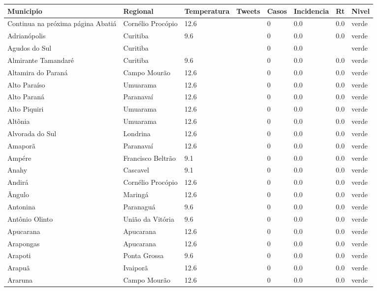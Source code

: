\begin{longtable}{l|lllllll}
  \hline
Municipio & Regional & Temperatura & Tweets & Casos & Incidencia & Rt & Nivel \\ 
  \hline
\endhead
\hline
{\footnotesize Continua na próxima página}
\endfoot
\endlastfoot
Abatiá & Cornélio Procópio & 12.6 &  & 0 & 0.0 & 0.0 & verde \\ 
  Adrianópolis & Curitiba & 9.6 &  & 0 & 0.0 & 0.0 & verde \\ 
  Agudos do Sul & Curitiba &  &  & 0 & 0.0 &  & verde \\ 
  Almirante Tamandaré & Curitiba & 9.6 &  & 0 & 0.0 & 0.0 & verde \\ 
  Altamira do Paraná & Campo Mourão & 12.6 &  & 0 & 0.0 & 0.0 & verde \\ 
  Alto Paraíso & Umuarama & 12.6 &  & 0 & 0.0 & 0.0 & verde \\ 
  Alto Paraná & Paranavaí & 12.6 &  & 0 & 0.0 & 0.0 & verde \\ 
  Alto Piquiri & Umuarama & 12.6 &  & 0 & 0.0 & 0.0 & verde \\ 
  Altônia & Umuarama & 12.6 &  & 0 & 0.0 & 0.0 & verde \\ 
  Alvorada do Sul & Londrina & 12.6 &  & 0 & 0.0 & 0.0 & verde \\ 
  Amaporã & Paranavaí & 12.6 &  & 0 & 0.0 & 0.0 & verde \\ 
  Ampére & Francisco Beltrão & 9.1 &  & 0 & 0.0 & 0.0 & verde \\ 
  Anahy & Cascavel & 9.1 &  & 0 & 0.0 & 0.0 & verde \\ 
  Andirá & Cornélio Procópio & 12.6 &  & 0 & 0.0 & 0.0 & verde \\ 
  Ângulo & Maringá & 12.6 &  & 0 & 0.0 & 0.0 & verde \\ 
  Antonina & Paranaguá & 9.6 &  & 0 & 0.0 & 0.0 & verde \\ 
  Antônio Olinto & União da Vitória & 9.6 &  & 0 & 0.0 & 0.0 & verde \\ 
  Apucarana & Apucarana & 12.6 &  & 0 & 0.0 & 0.0 & verde \\ 
  Arapongas & Apucarana & 12.6 &  & 0 & 0.0 & 0.0 & verde \\ 
  Arapoti & Ponta Grossa & 9.6 &  & 0 & 0.0 & 0.0 & verde \\ 
  Arapuã & Ivaiporã & 12.6 &  & 0 & 0.0 & 0.0 & verde \\ 
  Araruna & Campo Mourão & 12.6 &  & 0 & 0.0 & 0.0 & verde \\ 

\end{longtable}
